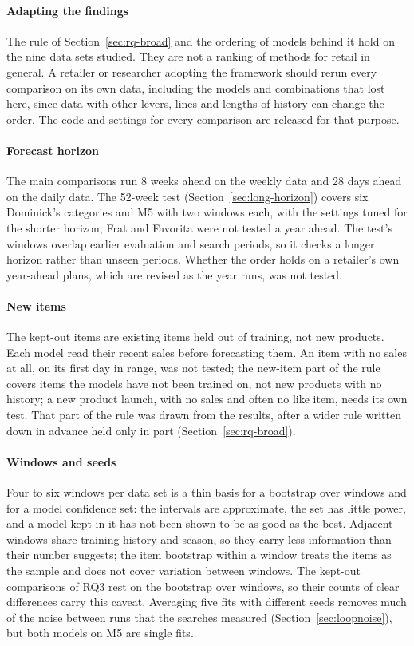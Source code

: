 \paragraph{Adapting the findings}
The rule of Section~\ref{sec:rq-broad} and the ordering of models behind it hold
on the nine data sets studied. They are not a ranking of methods for retail in
general. A retailer or researcher adopting the framework should rerun every
comparison on its own data, including the models and combinations that lost
here, since data with other levers, lines and lengths of history can change the
order. The code and settings for every comparison are released for that purpose.

\paragraph{Forecast horizon}
The main comparisons run 8 weeks ahead on the weekly data and 28 days ahead on
the daily data. The 52-week test (Section~\ref{sec:long-horizon}) covers six
Dominick's categories and M5 with two windows each, with the settings tuned for
the shorter horizon; Frat and Favorita were not tested a year ahead. The test's windows overlap earlier evaluation and search
periods, so it checks a longer horizon rather than unseen periods. Whether the order holds
on a retailer's own year-ahead plans, which are revised as the year runs, was not
tested.

\paragraph{New items}
The kept-out items are existing items held out of training, not new products. Each
model read their recent sales before forecasting them. An item with no sales at all, on its
first day in range, was not tested; the new-item part of the rule covers items
the models have not been trained on, not new products with no history; a new
product launch, with no sales and often no like item, needs its own test. That part of
the rule was drawn from the results, after a wider rule written down in advance
held only in part (Section~\ref{sec:rq-broad}).

\paragraph{Windows and seeds}
Four to six windows per data set is a thin basis for a bootstrap over windows
and for a model confidence set: the intervals are approximate, the set has
little power, and a model kept in it has not been shown to be as good as the
best. Adjacent windows share training history and season, so they carry less
information than their number suggests; the item bootstrap within a window
treats the items as the sample and does not cover variation between windows.
The kept-out comparisons of RQ3 rest on the bootstrap over windows, so their
counts of clear differences carry this caveat.
Averaging five fits with different seeds removes much of the noise between runs
that the searches measured (Section~\ref{sec:loopnoise}), but both models on M5
are single fits.

